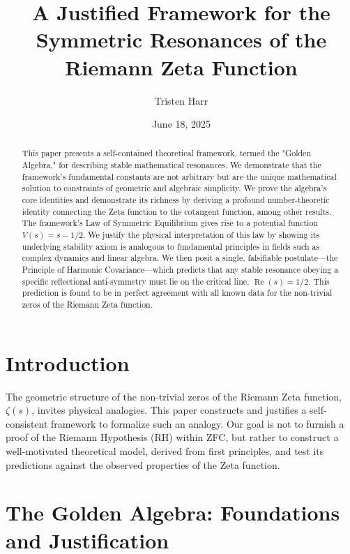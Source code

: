 \documentclass{amsart}
\title[A Framework for Zeta Resonances]{A Justified Framework for the Symmetric Resonances of the Riemann Zeta Function}
\author{Tristen Harr}
\date{June 18, 2025}
\theoremstyle{plain}
\theoremstyle{definition}
\theoremstyle{remark}
\DeclareMathOperator{\re}{Re}
\begin{document}
\begin{abstract}
This paper presents a self-contained theoretical framework, termed the "Golden Algebra," for describing stable mathematical resonances. We demonstrate that the framework's fundamental constants are not arbitrary but are the unique mathematical solution to constraints of geometric and algebraic simplicity. We prove the algebra's core identities and demonstrate its richness by deriving a profound number-theoretic identity connecting the Zeta function to the cotangent function, among other results. The framework's Law of Symmetric Equilibrium gives rise to a potential function $V(s) = s - 1/2$. We justify the physical interpretation of this law by showing its underlying stability axiom is analogous to fundamental principles in fields such as complex dynamics and linear algebra. We then posit a single, falsifiable postulate—the Principle of Harmonic Covariance—which predicts that any stable resonance obeying a specific reflectional anti-symmetry must lie on the critical line, $\re(s)=1/2$. This prediction is found to be in perfect agreement with all known data for the non-trivial zeros of the Riemann Zeta function.
\end{abstract}

\maketitle

\section{Introduction}
The geometric structure of the non-trivial zeros of the Riemann Zeta function, $\zeta(s)$, invites physical analogies. This paper constructs and justifies a self-consistent framework to formalize such an analogy. Our goal is not to furnish a proof of the Riemann Hypothesis (RH) within ZFC, but rather to construct a well-motivated theoretical model, derived from first principles, and test its predictions against the observed properties of the Zeta function.

\section{The Golden Algebra: Foundations and Justification}
\end{document}
